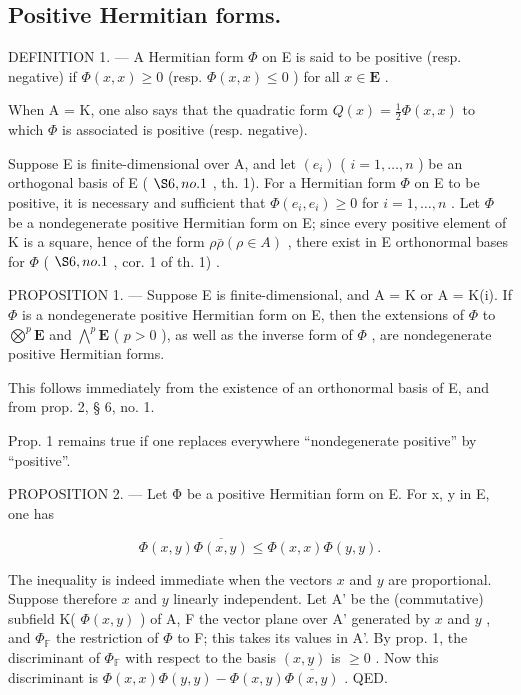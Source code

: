 \subsection{Positive Hermitian forms.}

DEFINITION 1. --- A Hermitian form \(\Phi\) on E is said to be positive (resp. negative) if \(\Phi(x, x) \geqslant 0\) (resp. \(\Phi(x, x) \leqslant 0\) ) for all \(x \in \mathbf{E}\) .

When A = K, one also says that the quadratic form \(Q(x) = \frac{1}{2} \Phi(x, x)\) to which \(\Phi\) is associated is positive (resp. negative).

Suppose E is finite-dimensional over A, and let \((e_{i})\) ( \(i = 1, \ldots, n\) ) be an orthogonal basis of E ( \(\S 6, no. 1\) , th. 1). For a Hermitian form \(\Phi\) on E to be positive, it is necessary and sufficient that \(\Phi(e_{i}, e_{i}) \geqslant 0\) for \(i = 1, \ldots, n\) . Let \(\Phi\) be a nondegenerate positive Hermitian form on E; since every positive element of K is a square, hence of the form \(\rho\bar{\rho} (\rho \in A)\) , there exist in E orthonormal bases for \(\Phi\) ( \(\S 6, no. 1\) , cor. 1 of th. 1) .

PROPOSITION 1. --- Suppose E is finite-dimensional, and A = K or A = K(i). If \(\Phi\) is a nondegenerate positive Hermitian form on E, then the extensions of \(\Phi\) to \(\bigotimes^{p}\mathbf{E}\) and \(\bigwedge^{p}\mathbf{E}\) ( \(p > 0\) ), as well as the inverse form of \(\Phi\) , are nondegenerate positive Hermitian forms.

This follows immediately from the existence of an orthonormal basis of E, and from prop. 2, § 6, no. 1.

Prop. 1 remains true if one replaces everywhere “nondegenerate positive” by “positive”.

PROPOSITION 2. --- Let Φ be a positive Hermitian form on E. For x, y in E, one has

\[
\Phi (x, y) \overline {{{{\Phi (x , y)}}}} \leqslant \Phi (x, x) \Phi (y, y).\tag{1}
\]

The inequality is indeed immediate when the vectors \(x\) and \(y\) are proportional. Suppose therefore \(x\) and \(y\) linearly independent. Let A' be the (commutative) subfield K( \(\Phi(x, y)\) ) of A, F the vector plane over A' generated by \(x\) and \(y\) , and \(\Phi_{\mathbb{F}}\) the restriction of \(\Phi\) to F; this takes its values in A'. By prop. 1, the discriminant of \(\Phi_{\mathbb{F}}\) with respect to the basis \((x, y)\) is \(\geqslant 0\) . Now this discriminant is \(\Phi(x, x)\Phi(y, y) - \Phi(x, y)\overline{\Phi(x, y)}\) . QED.

